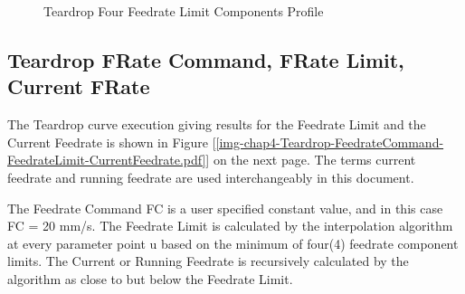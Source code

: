 \begin{figure}
	\caption  {Teardrop Four Feedrate Limit Components Profile}
	\label{img-chap4-Teardrop Four Feedrate Limit Components Profile.pdf}
\end{figure}	

\clearpage
\pagebreak

\subsection{Teardrop FRate Command, FRate Limit, Current FRate}
\label{ssec-chap4-Teardrop-FeedrateCommand-FeedrateLimit-CurrentFeedrate}

The Teardrop curve execution giving results for the Feedrate Limit and the  Current Feedrate is shown in Figure [\ref{img-chap4-Teardrop-FeedrateCommand-FeedrateLimit-CurrentFeedrate.pdf}] on the next page. The terms current feedrate and running feedrate are used interchangeably in this document.

The Feedrate Command FC is a user specified constant value, and in this case FC = 20 mm/s. The Feedrate Limit is calculated by the interpolation algorithm at every parameter point u based on the minimum of four(4) feedrate component limits. The Current or Running Feedrate is recursively calculated by the algorithm as close to but below the Feedrate Limit.\\


